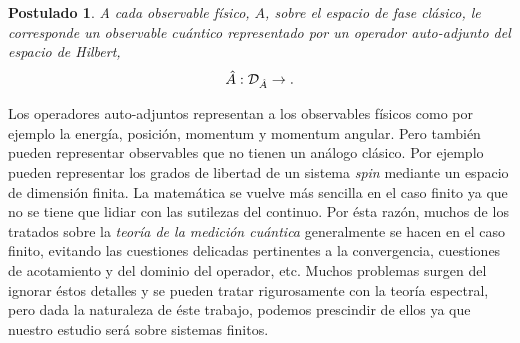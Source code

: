\documentclass[a4paper,11pt]{report}
\let\H\relax
\DeclareMathOperator{\H}{\mathcal H}
\newtheorem{axiom}{Postulado}
\begin{document}
  \begin{axiom}
    \label{ax:2}
    A cada observable físico, $A$, sobre el espacio de fase
    clásico, le corresponde un observable cuántico
    representado por un operador auto-adjunto del espacio de
    Hilbert, 
    \[
      \hat{A} : \mathcal D_{\hat{A}} \to \H.  
    \]
  \end{axiom}
  
  Los operadores auto-adjuntos representan a los observables
  físicos como por ejemplo la energía, posición, momentum y
  momentum angular. Pero también pueden representar
  observables que no tienen un análogo clásico. Por ejemplo
  pueden representar los grados de libertad de un sistema
  \textit{spin} mediante un espacio de dimensión finita. La
  matemática se vuelve más sencilla en el caso finito ya que
  no se tiene que lidiar con las sutilezas del continuo. Por
  ésta razón, muchos de los tratados sobre la \textit{teoría
  de la medición cuántica} generalmente se hacen en el caso
  finito, evitando las cuestiones delicadas pertinentes a
  la convergencia, cuestiones de acotamiento y del dominio
  del operador, etc.  Muchos problemas surgen del ignorar
  éstos detalles y se pueden tratar rigurosamente con la
  teoría espectral, pero dada la naturaleza de éste trabajo,
  podemos prescindir de ellos ya que nuestro estudio será
  sobre sistemas finitos.
\end{document}
